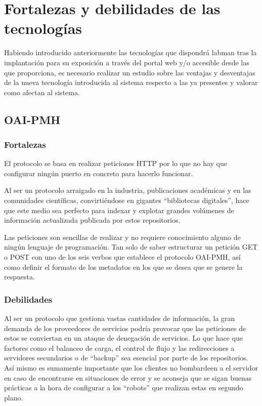 \section{Fortalezas y debilidades de las tecnologías}

Habiendo introducido anteriormente las tecnologías que dispondrá \acrshort{labman} tras la implantación para su exposición a través del portal web y/o accesible desde las  que proporciona, es necesario realizar un estudio sobre las ventajas y desventajas de la nueva tecnología introducida al sistema respecto a las ya presentes y valorar como afectan al sistema.

\subsection{OAI-PMH}

\subsubsection{Fortalezas}

El protocolo se basa en realizar peticiones HTTP por lo que no hay que configurar ningún puerto en concreto para hacerlo funcionar.

Al ser un protocolo arraigado en la industria, publicaciones académicas y en las comunidades científicas, convirtiéndose en gigantes ``bibliotecas digitales'', hace que este medio sea perfecto para indexar y explotar grandes volúmenes de información actualizada publicada por estos repositorios.

Las peticiones son sencillas de realizar y no requiere conocimiento alguno de ningún lenguaje de programación. Tan solo de saber estructurar un petición GET o POST con uno de los seis verbos que establece el protocolo OAI-PMH, así como definir el formato de los metadatos en los que se desea que se genere la respuesta.

\subsubsection{Debilidades}

Al ser un protocolo que gestiona vastas cantidades de información, la gran demanda de los proveedores de servicios podría provocar que las peticiones de estos se conviertan en un ataque de denegación de servicios. Lo que hace que factores como el balanceo de carga, el control de flujo y las redirecciones a servidores secundarios o de ``backup'' sea  esencial por parte de los repositorios. Así mismo es sumamente importante que los clientes no bombardeen a el servidor en caso de encontrarse en situaciones de error y se aconseja que se sigan buenas prácticas a la hora de configurar a los ``robots'' que realizan estas en segundo plano.

